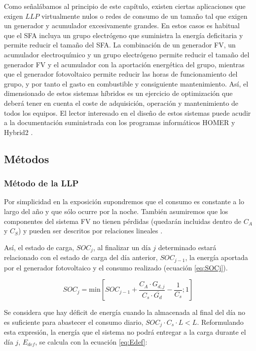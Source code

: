 Como señalábamos al principio de este capítulo, existen ciertas aplicaciones
que exigen $LLP$ virtualmente nulos o redes de consumo de un tamaño
tal que exigen un generador y acumulador excesivamente grandes. En
estos casos es habitual que el SFA incluya un grupo electrógeno que
suministra la energía deficitaria y permite reducir el tamaño del
SFA. La combinación de un generador FV, un acumulador electroquímico
y un grupo electrógeno permite reducir el tamaño del generador FV
y el acumulador con la aportación energética del grupo, mientras que
el generador fotovoltaico permite reducir las horas de funcionamiento
del grupo, y por tanto el gasto en combustible y consiguiente mantenimiento.
Así, el dimensionado de estos sistemas híbridos es un ejercicio de
optimización que deberá tener en cuenta el coste de adquisición, operación
y mantenimiento de todos los equipos. El lector interesado en el diseño
de estos sistemas puede acudir a la documentación suministrada con
los programas informáticos HOMER \cite{Homer-Energy} y Hybrid2 \cite{Hybrid2}.




\subsection{Métodos}


\subsubsection{Método de la LLP}

Por simplicidad en la exposición supondremos que el consumo es constante
a lo largo del año y que sólo ocurre por la noche. También asumiremos
que los componentes del sistema FV no tienen pérdidas (quedarán incluidas
dentro de $C_{A}$ y $C_{S}$) y pueden ser descritos por relaciones
lineales \cite{Lorenzo.Narvarte2000}.

Así, el estado de carga, $SOC_{j}$, al finalizar un día $j$ determinado
estará relacionado con el estado de carga del día anterior, $SOC_{j-1}$,
la energía aportada por el generador fotovoltaico y el consumo realizado
(ecuación \ref{eq:SOCj}).

\begin{equation}
SOC_{j}=\mathrm{min}[SOC_{j-1}+\frac{C_{A}\cdot G_{d,j}}{C_{s}\cdot\overline{G_{d}}}-\frac{1}{C_{s}};1]\label{eq:SOCj}\end{equation}


Se considera que hay déficit de energía cuando la almacenada al final
del día no es suficiente para abastecer el consumo diario, $SOC_{j}\cdot C_{s}\cdot L<L$.
Reformulando esta expresión, la energía que el sistema no podrá entregar
a la carga durante el día $j$, $E_{def}$, se calcula con la ecuación
\ref{eq:Edef}:

